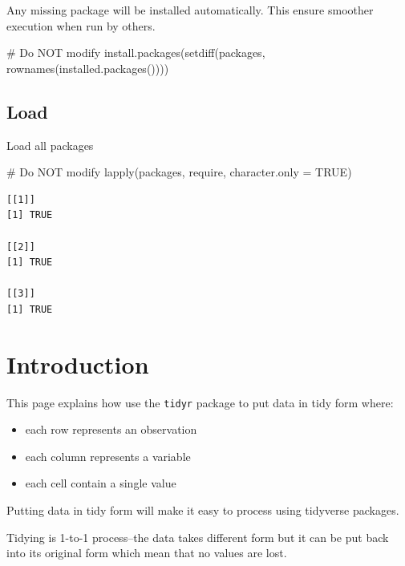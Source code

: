 \documentclass[
  letterpaper,
  DIV=11,
  numbers=noendperiod]{scrreprt}
\newenvironment{Shaded}{\begin{snugshade}}{\end{snugshade}}
\newcommand{\AttributeTok}[1]{\textcolor[rgb]{0.40,0.45,0.13}{#1}}
\newcommand{\CommentTok}[1]{\textcolor[rgb]{0.37,0.37,0.37}{#1}}
\newcommand{\ConstantTok}[1]{\textcolor[rgb]{0.56,0.35,0.01}{#1}}
\newcommand{\FunctionTok}[1]{\textcolor[rgb]{0.28,0.35,0.67}{#1}}
\newcommand{\NormalTok}[1]{\textcolor[rgb]{0.00,0.23,0.31}{#1}}
\providecommand{\tightlist}{%
  \setlength{\itemsep}{0pt}\setlength{\parskip}{0pt}}\usepackage{longtable,booktabs,array}
\begin{document}
Any missing package will be installed automatically. This ensure
smoother execution when run by others.

\begin{Shaded}
\begin{Highlighting}[]
\CommentTok{\# Do NOT modify}
\FunctionTok{install.packages}\NormalTok{(}\FunctionTok{setdiff}\NormalTok{(packages, }\FunctionTok{rownames}\NormalTok{(}\FunctionTok{installed.packages}\NormalTok{())))}
\end{Highlighting}
\end{Shaded}

\subsection*{Load}\label{load-7}

Load all packages

\begin{Shaded}
\begin{Highlighting}[]
\CommentTok{\# Do NOT modify}
\FunctionTok{lapply}\NormalTok{(packages, require, }\AttributeTok{character.only =} \ConstantTok{TRUE}\NormalTok{)}
\end{Highlighting}
\end{Shaded}

\begin{verbatim}
[[1]]
[1] TRUE

[[2]]
[1] TRUE

[[3]]
[1] TRUE
\end{verbatim}

\section{Introduction}\label{introduction-4}

This page explains how use the \texttt{tidyr} package to put data in
tidy form where:

\begin{itemize}
\tightlist
\item
  each row represents an observation
\item
  each column represents a variable
\item
  each cell contain a single value
\end{itemize}

Putting data in tidy form will make it easy to process using tidyverse
packages.

\begin{tcolorbox}[enhanced jigsaw, opacityback=0, title=\textcolor{quarto-callout-note-color}{\faInfo}\hspace{0.5em}{Data Trasformation Bottom-Line}, colback=white, leftrule=.75mm, colbacktitle=quarto-callout-note-color!10!white, bottomrule=.15mm, colframe=quarto-callout-note-color-frame, arc=.35mm, bottomtitle=1mm, coltitle=black, toptitle=1mm, toprule=.15mm, opacitybacktitle=0.6, rightrule=.15mm, titlerule=0mm, breakable, left=2mm]

Tidying is 1-to-1 process--the data takes different form but it can be
put back into its original form which mean that no values are lost.

\end{tcolorbox}
\end{document}
